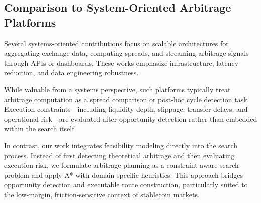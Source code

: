 \subsection{Comparison to System-Oriented Arbitrage Platforms}

Several systems-oriented contributions focus on scalable architectures for aggregating exchange data, computing spreads, and streaming arbitrage signals through APIs or dashboards. These works emphasize infrastructure, latency reduction, and data engineering robustness.

While valuable from a systems perspective, such platforms typically treat arbitrage computation as a spread comparison or post-hoc cycle detection task. Execution constraints—including liquidity depth, slippage, transfer delays, and operational risk—are evaluated after opportunity detection rather than embedded within the search itself.

In contrast, our work integrates feasibility modeling directly into the search process. Instead of first detecting theoretical arbitrage and then evaluating execution risk, we formulate arbitrage planning as a constraint-aware search problem and apply A* with domain-specific heuristics. This approach bridges opportunity detection and executable route construction, particularly suited to the low-margin, friction-sensitive context of stablecoin markets.
